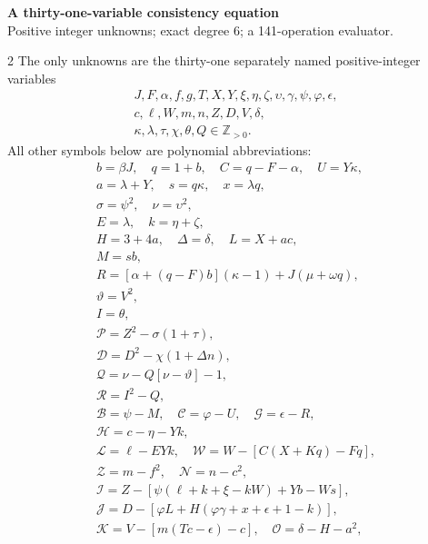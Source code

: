 \documentclass[10pt]{article}
\begin{document}
\begin{center}
{\large\bfseries A thirty-one-variable consistency equation}\\[-1pt]
{\small Positive integer unknowns; exact degree 6; a 141-operation evaluator.}
\end{center}\vspace{-8pt}
\begin{multicols}{2}
\fontsize{8.6}{9.1}\selectfont
The only unknowns are the thirty-one separately named positive-integer variables
\[
\begin{gathered}J,F,\alpha,f,g,T,X,Y,\xi,\eta,\zeta,\upsilon,\gamma,\psi,\varphi,\epsilon,\\
c,\ell,W,m,n,Z,D,V,\delta,\\
\kappa,\lambda,\tau,\chi,\theta,Q\in\mathbb Z_{>0}.\end{gathered}
\]
All other symbols below are polynomial abbreviations:
\[
\begin{gathered}
b=\beta J,\quad q=1+b,\quad C=q-F-\alpha,\quad U=Y\kappa,\\
a=\lambda+Y,\quad s=q\kappa,\quad x=\lambda q,\\
\sigma=\psi^2,\quad\nu=\upsilon^2,\\
E=\lambda,\quad k=\eta+\zeta,\\
H=3+4a,\quad\Delta=\delta,\quad L=X+ac,\\
M=sb,\\
R=[\alpha+(q-F)b](\kappa-1)+J(\mu+\omega q),\\
\vartheta=V^2,\\
I=\theta,\\
\mathcal{P}=Z^2-\sigma(1+\tau),\\
\mathcal{D}=D^2-\chi(1+\Delta n),\\
\mathcal{Q}=\nu-Q[\nu-\vartheta]-1,\\
\mathcal{R}=I^2-Q,\\
\mathcal{B}=\psi-M,\quad \mathcal{C}=\varphi-U,\quad \mathcal{G}=\epsilon-R,\\
\mathcal{H}=c-\eta-Yk,\\
\mathcal{L}=\ell-EYk,\quad \mathcal{W}=W-[C(X+Kq)-Fq],\\
\mathcal{Z}=m-f^2,\quad \mathcal{N}=n-c^2,\\
\mathcal{I}=Z-[\psi(\ell+k+\xi-kW)+Yb-Ws],\\
\mathcal{J}=D-[\varphi L+H(\varphi\gamma+x+\epsilon+1-k)],\\
\mathcal{K}=V-[m(Tc-\epsilon)-c],\quad\mathcal{O}=\delta-H-a^2,\\

\end{gathered}\]
\end{multicols}
\end{document}
